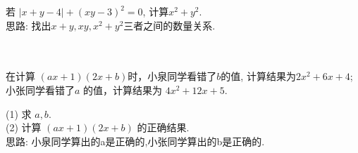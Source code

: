 \item {
    若 $\lvert x+y-4 \rvert + (xy-3)^2 = 0$, 计算$x^2 + y^2$.
    \ifshowSolution
        \fangsong{}
        \\
        思路: 找出$x+y, xy, x^2+y^2$三者之间的数量关系.
    \else
        \\ \\ \\
    \fi
}

\item {
    在计算 $(ax+1)(2x+b)$时，小泉同学看错了$b$的值, 计算结果为$2x^2 + 6x + 4$; 小张同学看错了$a$ 的值，计算结果为 $4x^2+12x+5$.

    (1) 求 $a,b$.\\
    (2) 计算 $(ax+1)(2x+b)$ 的正确结果.
    \ifshowSolution
        \fangsong{}
        \\
        思路: 小泉同学算出的a是正确的,小张同学算出的b是正确的.
    \else
        \\ \\ \\ \\ 
    \fi
}
